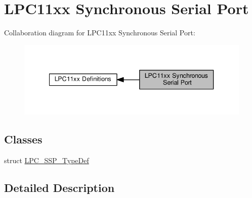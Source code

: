 \hypertarget{group___l_p_c11xx___s_s_p}{}\section{L\+P\+C11xx Synchronous Serial Port}
\label{group___l_p_c11xx___s_s_p}
Collaboration diagram for L\+P\+C11xx Synchronous Serial Port\+:\nopagebreak
\begin{figure}[H]
\begin{center}
\leavevmode
\includegraphics[width=340pt]{group___l_p_c11xx___s_s_p}
\end{center}
\end{figure}
\subsection*{Classes}
\begin{DoxyCompactItemize}
\item 
struct \hyperlink{struct_l_p_c___s_s_p___type_def}{L\+P\+C\+\_\+\+S\+S\+P\+\_\+\+Type\+Def}
\end{DoxyCompactItemize}


\subsection{Detailed Description}
